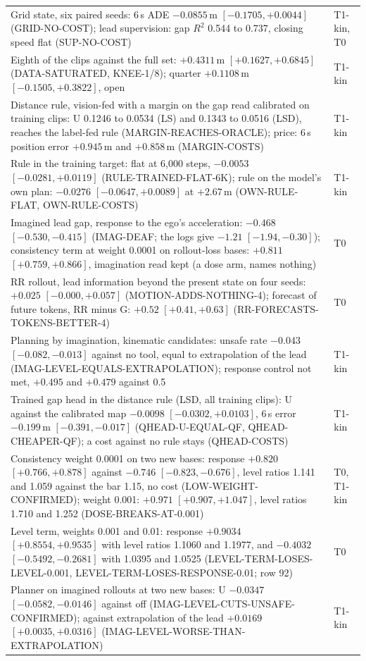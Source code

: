 \documentclass[10pt,twocolumn]{article}
\theoremstyle{remark}
\begin{document}
\begin{table}[!t]
\begin{tabularx}{\columnwidth}{@{}>{\raggedright\arraybackslash}Xl@{}}
Grid state, six paired seeds: 6\,s ADE $-0.0855$\,m $[-0.1705,+0.0044]$ (GRID-NO-COST); lead supervision: gap $R^2$ 0.544 to 0.737, closing speed flat (SUP-NO-COST) & T1-kin, T0 \\
Eighth of the clips against the full set: $+0.4311$\,m $[+0.1627,+0.6845]$ (DATA-SATURATED, KNEE-1/8); quarter $+0.1108$\,m $[-0.1505,+0.3822]$, open & T1-kin \\
Distance rule, vision-fed with a margin on the gap read calibrated on training clips: U 0.1246 to 0.0534 (LS) and 0.1343 to 0.0516 (LSD), reaches the label-fed rule (MARGIN-REACHES-ORACLE); price: 6\,s position error $+0.945$\,m and $+0.858$\,m (MARGIN-COSTS) & T1-kin \\
Rule in the training target: flat at 6,000 steps, $-0.0053$ $[-0.0281,+0.0119]$ (RULE-TRAINED-FLAT-6K); rule on the model's own plan: $-0.0276$ $[-0.0647,+0.0089]$ at $+2.67$\,m (OWN-RULE-FLAT, OWN-RULE-COSTS) & T1-kin \\
Imagined lead gap, response to the ego's acceleration: $-0.468$ $[-0.530,-0.415]$ (IMAG-DEAF; the logs give $-1.21$ $[-1.94,-0.30]$); consistency term at weight 0.0001 on rollout-loss bases: $+0.811$ $[+0.759,+0.866]$, imagination read kept (a dose arm, names nothing) & T0 \\
RR rollout, lead information beyond the present state on four seeds: $+0.025$ $[-0.000,+0.057]$ (MOTION-ADDS-NOTHING-4); forecast of future tokens, RR minus G: $+0.52$ $[+0.41,+0.63]$ (RR-FORECASTS-TOKENS-BETTER-4) & T0 \\
Planning by imagination, kinematic candidates: unsafe rate $-0.043$ $[-0.082,-0.013]$ against no tool, equal to extrapolation of the lead (IMAG-LEVEL-EQUALS-EXTRAPOLATION); response control not met, $+0.495$ and $+0.479$ against 0.5 & T1-kin \\
Trained gap head in the distance rule (LSD, all training clips): U against the calibrated map $-0.0098$ $[-0.0302,+0.0103]$, 6\,s error $-0.199$\,m $[-0.391,-0.017]$ (QHEAD-U-EQUAL-QF, QHEAD-CHEAPER-QF); a cost against no rule stays (QHEAD-COSTS) & T1-kin \\
Consistency weight 0.0001 on two new bases: response $+0.820$ $[+0.766,+0.878]$ against $-0.746$ $[-0.823,-0.676]$, level ratios 1.141 and 1.059 against the bar 1.15, no cost (LOW-WEIGHT-CONFIRMED); weight 0.001: $+0.971$ $[+0.907,+1.047]$, level ratios 1.710 and 1.252 (DOSE-BREAKS-AT-0.001) & T0, T1-kin \\
Level term, weights 0.001 and 0.01: response $+0.9034$ $[+0.8554,+0.9535]$ with level ratios 1.1060 and 1.1977, and $-0.4032$ $[-0.5492,-0.2681]$ with 1.0395 and 1.0525 (LEVEL-TERM-LOSES-LEVEL-0.001, LEVEL-TERM-LOSES-RESPONSE-0.01; row 92) & T0 \\
Planner on imagined rollouts at two new bases: U $-0.0347$ $[-0.0582,-0.0146]$ against off (IMAG-LEVEL-CUTS-UNSAFE-CONFIRMED); against extrapolation of the lead $+0.0169$ $[+0.0035,+0.0316]$ (IMAG-LEVEL-WORSE-THAN-EXTRAPOLATION) & T1-kin \\
\bottomrule
\end{tabularx}
\end{table}
\end{document}
